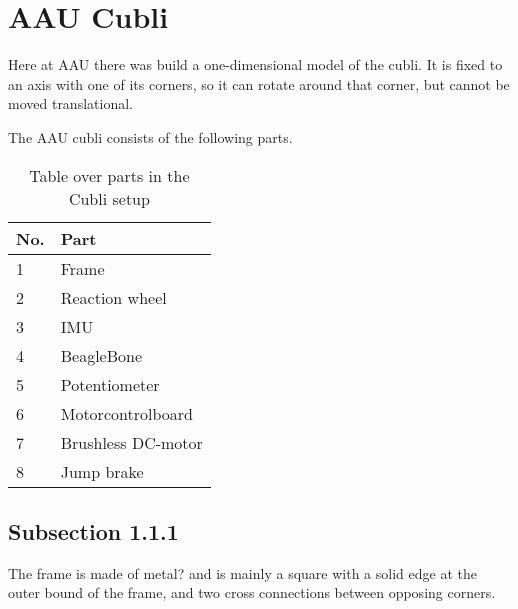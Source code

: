 \section{AAU Cubli}
Here at AAU there was build a one-dimensional model of the cubli. It is fixed to an axis with one of its corners, so it can rotate around that corner, but cannot be moved translational.

The AAU cubli consists of the following parts.

\begin{table}[H]
	\begin{tabular}{|l|p{3.8cm}|}
		\hline %
		\textbf{No.} &\textbf{Part} 			\\
		\hline %
		1            & Frame           			\\
		\hline %
		2            & Reaction wheel      		\\
		\hline %
		3            & IMU           			\\
		\hline %
		4            & BeagleBone           	\\
		\hline %
		5            & Potentiometer           	\\
		\hline %
		6            & Motorcontrolboard    	\\
		\hline %
		7            & Brushless DC-motor    	\\
		\hline %
		8            & Jump brake		    	\\
		\hline %
	\end{tabular}
	\caption{Table over parts in the Cubli setup \label{TableAAUCubliComponent}}
\end{table}

\subsection{Subsection 1.1.1}
The frame is made of metal?  and is mainly a square with a solid edge at the outer bound of the frame, and two cross connections between opposing corners. 

